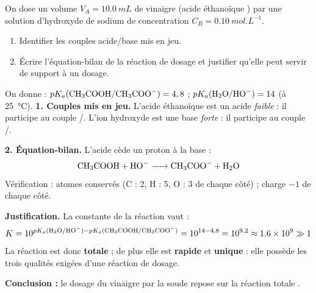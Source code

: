 \documentclass[11pt]{article}
\begin{document}
\begin{exoresolu}
On dose un volume $V_A = \SI{10,0}{mL}$ de vinaigre (acide éthanoïque ) par une solution d'hydroxyde de sodium de concentration $C_B = \SI{0,10}{mol.L^{-1}}$.
\begin{enumerate}
\item Identifier les couples acide/base mis en jeu.
\item Écrire l'équation-bilan de la réaction de dosage et justifier qu'elle peut servir de support à un dosage.
\end{enumerate}
On donne : $pK_a(\ce{CH3COOH}/\ce{CH3COO-}) = 4,8$ ; $pK_a(\ce{H2O}/\ce{HO-}) = 14$ (à \SI{25}{\celsius}).
\tcblower
\textbf{1. Couples mis en jeu.} L'acide éthanoïque est un acide \emph{faible} : il participe au couple /. L'ion hydroxyde  est une base \emph{forte} : il participe au couple /.

\textbf{2. Équation-bilan.} L'acide  cède un proton à la base  :
\[ \ce{CH3COOH + HO- -> CH3COO- + H2O} \]
Vérification : atomes conservés (C : 2, H : 5, O : 3 de chaque côté) ; charge $-1$ de chaque côté.

\textbf{Justification.} La constante de la réaction vaut :
\[ K = 10^{pK_a(\ce{H2O}/\ce{HO-}) - pK_a(\ce{CH3COOH}/\ce{CH3COO-})} = 10^{14 - 4,8} = 10^{9,2} \approx \num{1,6e9} \gg 1 \]
La réaction est donc \textbf{totale} ; de plus elle est \textbf{rapide} et \textbf{unique} : elle possède les trois qualités exigées d'une réaction de dosage.

\textbf{Conclusion :} le dosage du vinaigre par la soude repose sur la réaction totale .
\end{exoresolu}
\end{document}
